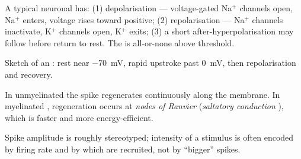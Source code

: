 \begin{proposition}\label{prop:g12:nerves-hormones:phases}
A typical neuronal  has: (1) depolarisation --- voltage-gated
Na$^{+}$ channels open, Na$^{+}$ enters, voltage rises toward positive;
(2) repolarisation --- Na$^{+}$ channels inactivate, K$^{+}$ channels
open, K$^{+}$ exits; (3) a short after-hyperpolarisation may follow
before return to rest. The  is all-or-none above threshold.
\end{proposition}
\admitted

\begin{omfigure}

{\small Sketch of an : rest near \qty{-70}{mV}, rapid
upstroke past \qty{0}{mV}, then repolarisation and recovery.}
\end{omfigure}

\begin{definition}
\label{def:g12:nerves-hormones:prop}
In unmyelinated  the spike regenerates continuously along the
membrane. In myelinated , regeneration occurs at \emph{nodes of
Ranvier} (\emph{saltatory conduction}
), which is faster and more energy-efficient.
\end{definition}

\begin{remark}\label{rem:g12:nerves-hormones:freq}
Spike amplitude is roughly stereotyped; intensity of a stimulus is often
encoded by firing rate and by which  are recruited, not by
``bigger'' spikes.
\end{remark}

